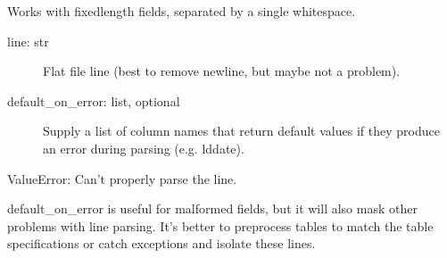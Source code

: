 \documentclass[letterpaper,10pt,english]{sphinxmanual}
\begin{document}
\begin{fulllineitems}
\begin{fulllineitems}
Works with fixed\sphinxhyphen{}length fields, separated by a single whitespace.
\begin{description}
\item[{line: str}] \leavevmode
Flat file line (best to remove newline, but maybe not a problem).

\item[{default\_on\_error: list, optional}] \leavevmode
Supply a list of column names that return default values if they
produce an error during parsing (e.g. lddate).

\end{description}

ValueError:  Can’t properly parse the line.

default\_on\_error is useful for malformed fields, but it will also mask
other problems with line parsing. It’s better to pre\sphinxhyphen{}process tables 
to match the table specifications or catch exceptions and isolate 
these lines.

\begin{sphinxVerbatim}[commandchars=\\\{\}]
   
   
\end{sphinxVerbatim}

\end{fulllineitems}


\begin{fulllineitems}
\label{\detokenize{infrapy.database:infrapy.database.schema.fd_results.maxfc}}
\end{fulllineitems}


\end{fulllineitems}
\end{document}
